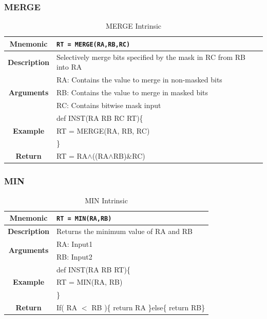 \documentclass{article}
\begin{document}
\clearpage
\subsubsection{MERGE}
\label{sec:MERGE}

\begin{table}[h]
\begin{center}
\caption{MERGE Intrinsic}
\vspace{0.125in}
\label{tab:MERGEIntrinsic}
\begin{tabular}{|c|l|}
\hline
\textbf{Mnemonic} & \texttt{RT = MERGE(RA,RB,RC)}\\
\hline
\textbf{Description} & Selectively merge bits specified by the mask in RC from RB into RA\\
\hline
\multirow{3}{*}{\textbf{Arguments}} & RA: Contains the value to merge in non-masked bits\\
                          			     & RB: Contains the value to merge in masked bits\\
			     			     & RC: Contains bitwise mask input\\
\hline
\multirow{3}{*}{\textbf{Example}} & def INST(RA RB RC RT)\{\\
                          			  &   RT = MERGE(RA, RB, RC)\\
                                                    & \}\\
\hline
\textbf{Return} & RT = RA$\wedge$((RA$\wedge$RB)\&RC) \\
\hline
\end{tabular}
\end{center}
\end{table}

\clearpage
\subsubsection{MIN}
\label{sec:MIN}

\begin{table}[h]
\begin{center}
\caption{MIN Intrinsic}
\vspace{0.125in}
\label{tab:MINIntrinsic}
\begin{tabular}{|c|l|}
\hline
\textbf{Mnemonic} & \texttt{RT = MIN(RA,RB)}\\
\hline
\textbf{Description} & Returns the minimum value of RA and RB\\
\hline
\multirow{2}{*}{\textbf{Arguments}} & RA: Input1\\
                          			     & RB: Input2\\
\hline
\multirow{3}{*}{\textbf{Example}} & def INST(RA RB RT)\{\\
                          			  &   RT = MIN(RA, RB)\\
                                                    & \}\\
\hline
\textbf{Return} & If( RA $<$ RB )\{ return RA \}else\{ return RB\}\\                                                    
\hline
\end{tabular}
\end{center}
\end{table}
\end{document}
